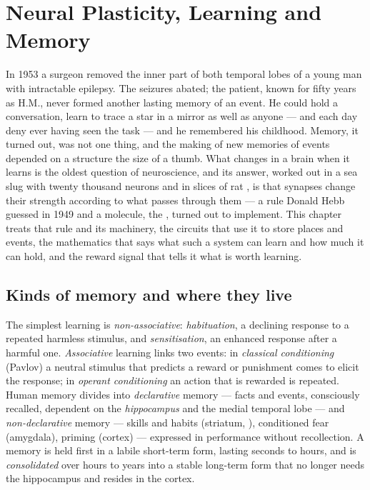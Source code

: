 \chapter{Neural Plasticity, Learning and Memory}\label{ch:b3:learning-memory}

In 1953 a surgeon removed the inner part of both temporal lobes of a
young man with intractable epilepsy. The seizures abated; the patient,
known for fifty years as H.M., never formed another lasting memory of
an event. He could hold a conversation, learn to trace a star in a
mirror as well as anyone --- and each day deny ever having seen the
task --- and he remembered his childhood. Memory, it turned out, was not
one thing, and the making of new memories of events depended on a
structure the size of a thumb. What changes in a brain when it learns
is the oldest question of neuroscience, and its answer, worked out in
a sea slug with twenty thousand neurons and in slices of rat
, is that synapses change their strength according to what
passes through them --- a rule Donald Hebb guessed in 1949 and a
molecule, the , turned out to implement. This chapter
treats that rule and its machinery, the circuits that use it to store
places and events, the mathematics that says what such a system can
learn and how much it can hold, and the reward signal that tells it
what is worth learning.

\section{Kinds of memory and where they live}

\begin{definition}\label{def:b3:learning-memory:kinds}
The simplest learning is \emph{non-associative}: \emph{habituation},
a declining response to a repeated harmless stimulus, and
\emph{sensitisation}, an enhanced response after a harmful one.
\emph{Associative} learning links two events: in \emph{classical
conditioning} (Pavlov) a neutral stimulus that predicts a reward or
punishment comes to elicit the response; in \emph{operant
conditioning} an action that is rewarded is repeated. Human memory
divides into \emph{declarative} memory --- facts and events, consciously
recalled, dependent on the \emph{hippocampus} and the medial temporal
lobe --- and \emph{non-declarative} memory --- skills and habits
(striatum, ), conditioned fear (amygdala), priming (cortex)
--- expressed in performance without recollection. A memory is held
first in a labile short-term form, lasting seconds to hours, and is
\emph{consolidated} over hours to years into a stable long-term form
that no longer needs the hippocampus and resides in the cortex.
\end{definition}

